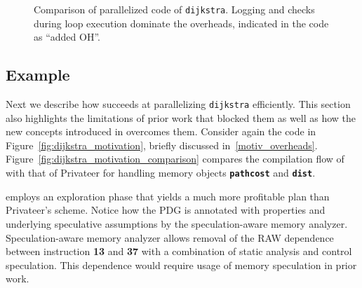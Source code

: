 \begin{figure}[!h]
\centering
\scriptsize
{}
\caption{Comparison of parallelized code of \texttt{dijkstra}. Logging and
checks during loop execution dominate the overheads, indicated in the code
as ``added OH''.}
\label{fig:dijkstra_motivation_comparison_source_code}
\end{figure}


\subsection{Example}
\label{motiv_example}

Next we describe how \name succeeds at parallelizing
\texttt{dijkstra} efficiently. This section also highlights the limitations
of prior work that blocked them as well as how the new concepts introduced
in \name overcomes them.
%
Consider again the code in Figure~\ref{fig:dijkstra_motivation},
briefly discussed in~\ref{motiv_overheads}.
%
Figure~\ref{fig:dijkstra_motivation_comparison} compares the
compilation flow of \name with that of Privateer for handling memory objects
\texttt{\textbf{pathcost}} and \texttt{\textbf{dist}}.

\name employs an exploration phase that yields a much more profitable plan
than Privateer's scheme.
Notice how the PDG is annotated with properties and underlying speculative
assumptions by the speculation-aware memory analyzer. Speculation-aware
memory analyzer allows removal of the RAW dependence between instruction
\textbf{13}
and \textbf{37} with a combination of static analysis and control speculation. This
dependence would require usage of memory speculation in prior work.
%

